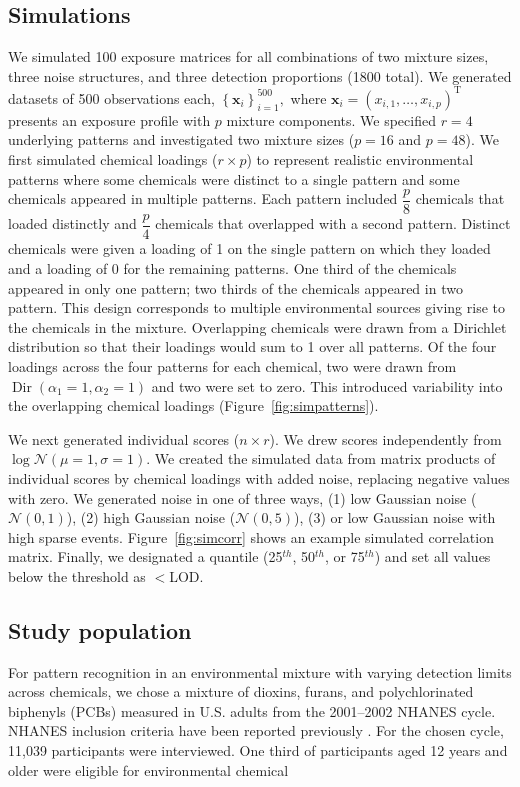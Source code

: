 \subsection{Simulations} We simulated 100 exposure matrices for all combinations of two mixture sizes, three noise structures, and three detection proportions (1800 total). We generated datasets of 500 observations each, $\left\{\mathbf{x}_{i}\right\}_{i=1}^{500},$ where $\mathbf{x}_{i} = \left(x_{i,1}, \ldots, x_{i,p}\right)^{\mathrm{T}}$ presents an exposure profile with $p$ mixture components. We specified $r = 4$ underlying patterns and investigated two mixture sizes ($p = 16$ and $p = 48$). We first simulated chemical loadings ($r \times p$) to represent realistic environmental patterns where some chemicals were distinct to a single pattern and some chemicals appeared in multiple patterns. Each pattern included $\dfrac{p}{8}$ chemicals that loaded distinctly and $\dfrac{p}{4}$ chemicals that overlapped with a second pattern. Distinct chemicals were given a loading of 1 on the single pattern on which they loaded and a loading of 0 for the remaining patterns. One third of the chemicals appeared in only one pattern; two thirds of the chemicals appeared in two pattern. This design corresponds to multiple environmental sources giving rise to the chemicals in the mixture. Overlapping chemicals were drawn from a Dirichlet distribution so that their loadings would sum to 1 over all patterns. Of the four loadings across the four patterns for each chemical, two were drawn from $\operatorname{Dir}(\alpha_1=1, \alpha_2=1)$ and two were set to zero. This introduced variability into the overlapping chemical loadings (Figure~\ref{fig:simpatterns}).

We next generated individual scores ($n \times r$). We drew scores independently from $\log\mathcal{N}(\mu = 1, \sigma = 1)$. We created the simulated data from matrix products of individual scores by chemical loadings with added noise, replacing negative values with zero. We generated noise in one of three ways, (1) low Gaussian noise ($\mathcal{N}(0,1)$), (2) high Gaussian noise ($\mathcal{N}(0,5)$), (3) or low Gaussian noise with high sparse events. Figure~\ref{fig:simcorr} shows an example simulated correlation matrix. Finally, we designated a quantile (25$^{th}$, 50$^{th}$, or 75$^{th}$) and set all values below the threshold as $<$LOD.

\subsection{Study population} For pattern recognition in an environmental mixture with varying detection limits across chemicals, we chose a mixture of dioxins, furans, and polychlorinated biphenyls (PCBs) measured in U.S. adults from the 2001--2002 NHANES cycle. NHANES inclusion criteria have been reported previously \citep{zipf2013health}. For the chosen cycle, 11,039 participants were interviewed. One third of participants aged 12 years and older were eligible for environmental chemical 

